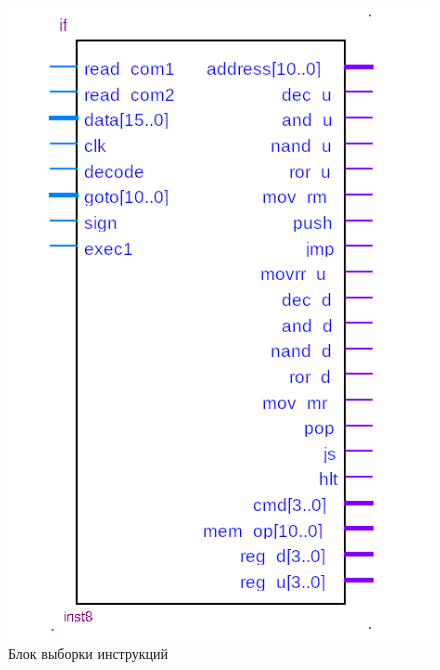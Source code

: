 \begin{figure}[ht]
\centering
    \includegraphics[scale=0.8]{ifc}
    \caption{Блок выборки инструкций}
\end{figure}


